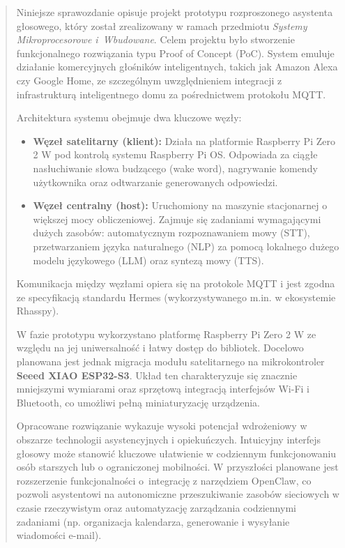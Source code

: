 \documentclass[12pt,a4paper]{article}
\title{}
\date{}
\begin{document}
\maketitle

\begin{abstract}
Niniejsze sprawozdanie opisuje projekt prototypu rozproszonego asystenta głosowego, który został zrealizowany w ramach przedmiotu \textit{Systemy Mikroprocesorowe i~Wbudowane}. Celem projektu było stworzenie funkcjonalnego rozwiązania typu Proof of Concept (PoC). System emuluje działanie komercyjnych głośników inteligentnych, takich jak Amazon Alexa czy Google Home, ze szczególnym uwzględnieniem integracji z infrastrukturą inteligentnego domu za pośrednictwem protokołu MQTT.

\medbreak

Architektura systemu obejmuje dwa kluczowe węzły:
\begin{itemize}
    \item \textbf{Węzeł satelitarny (klient):} Działa na platformie Raspberry Pi Zero 2 W pod kontrolą systemu Raspberry Pi OS. Odpowiada za ciągłe nasłuchiwanie słowa budzącego (wake word), nagrywanie komendy użytkownika oraz odtwarzanie generowanych odpowiedzi.
    \item \textbf{Węzeł centralny (host):} Uruchomiony na maszynie stacjonarnej o większej mocy obliczeniowej. Zajmuje się zadaniami wymagającymi dużych zasobów: automatycznym rozpoznawaniem mowy (STT), przetwarzaniem języka naturalnego (NLP) za pomocą lokalnego dużego modelu językowego (LLM) oraz syntezą mowy (TTS).
\end{itemize}

Komunikacja między węzłami opiera się na protokole MQTT i jest zgodna ze specyfikacją standardu Hermes (wykorzystywanego m.in. w ekosystemie Rhasspy).

W fazie prototypu wykorzystano platformę Raspberry Pi Zero 2 W ze względu na jej uniwersalność i łatwy dostęp do bibliotek. Docelowo planowana jest jednak migracja modułu satelitarnego na mikrokontroler \textbf{Seeed XIAO ESP32-S3}. Układ ten charakteryzuje się znacznie mniejszymi wymiarami oraz sprzętową integracją interfejsów Wi-Fi i Bluetooth, co umożliwi pełną miniaturyzację urządzenia.

Opracowane rozwiązanie wykazuje wysoki potencjał wdrożeniowy w obszarze technologii asystencyjnych i opiekuńczych. Intuicyjny interfejs głosowy może stanowić kluczowe ułatwienie w codziennym funkcjonowaniu osób starszych lub o ograniczonej mobilności. W przyszłości planowane jest rozszerzenie funkcjonalności o~integrację z narzędziem OpenClaw, co pozwoli asystentowi na autonomiczne przeszukiwanie zasobów sieciowych w czasie rzeczywistym oraz automatyzację zarządzania codziennymi zadaniami (np. organizacja kalendarza, generowanie i wysyłanie wiadomości e-mail).
\end{abstract}
\end{document}
